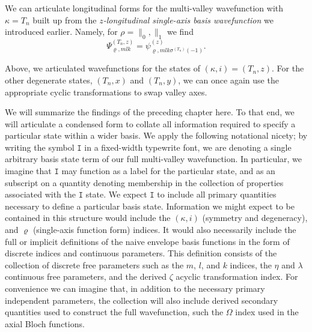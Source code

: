 We can articulate longitudinal forms for the multi-valley wavefunction with
$\kappa = T_{n}$ built up from the \emph{$z$-longitudinal single-axis basis
wavefunction} we introduced earlier. Namely, for $\rho = \parallel_{0},
\parallel_{1}$ we find
\begin{equation}
    \Psi_{\varrho,mlk}^{\left(T_{n},z\right)}
        =
            \psi_
            {\varrho,mlk\sigma^{\left(T_{n}\right)}\left(-1\right)}
            ^{\left(z\right)}
.
\end{equation}

Above, we articulated wavefunctions for the states of $\left(\kappa,i\right) =
\left(T_{n},z\right)$. For the other degenerate states, $\left(T_{n},x\right)$
and $\left(T_{n},y\right)$, we can once again use the appropriate cyclic
transformations to swap valley axes.


We will summarize the findings of the preceding chapter here. To that end, we
will articulate a condensed form to collate all information required to specify
a particular state within a wider basis. We apply the following notational
nicety; by writing the symbol $\mathtt{I}$ in a fixed-width typewrite font, we
are denoting a single arbitrary basis state term of our full multi-valley
wavefunction. In particular, we imagine that $\mathtt{I}$ may function as a
label for the particular state, and as an subscript on a quantity denoting
membership in the collection of properties associated with the $\mathtt{I}$
state. We expect $\mathtt{I}$ to include all primary quantities necessary to
define a particular basis state. Information we might expect to be contained in
this structure would include the $\left(\kappa,i\right)$ (symmetry and
degeneracy), and $\varrho$ (single-axis function form) indices. It would also
necessarily include the full or implicit definitions of the naive envelope basis
functions in the form of discrete indices and continuous parameters. This
definition consists of the collection of discrete free parameters such as the
$m$, $l$, and $k$ indices, the $\eta$ and $\lambda$ continuous free parameters,
and the derived $\zeta$ acyclic transformation index. For convenience we can
imagine that, in addition to the necessary primary independent parameters, the
collection will also include derived secondary quantities used to construct the
full wavefunction, such the $\Omega$ index used in the axial Bloch functions. 

